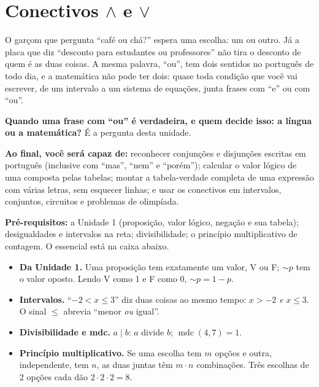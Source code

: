 \providecommand{\nao}{{\sim}}
\clearpage
\section{Conectivos \texorpdfstring{$\wedge$}{∧} e \texorpdfstring{$\vee$}{∨}}

\Prefacio
\begin{prefacio}

O garçom que pergunta \enquote{café ou chá?} espera uma escolha: um ou outro. Já a placa que diz \enquote{desconto para estudantes ou professores} não tira o desconto de quem é as duas coisas. A mesma palavra, \enquote{ou}, tem dois sentidos no português de todo dia, e a matemática não pode ter dois: quase toda condição que você vai escrever, de um intervalo a um sistema de equações, junta frases com \enquote{e} ou com \enquote{ou}.

\textbf{Quando uma frase com \enquote{ou} é verdadeira, e quem decide isso: a língua ou a matemática?} É a pergunta desta unidade.

\textbf{Ao final, você será capaz de:} reconhecer conjunções e disjunções escritas em português (inclusive com \enquote{mas}, \enquote{nem} e \enquote{porém}); calcular o valor lógico de uma composta pelas tabelas; montar a tabela-verdade completa de uma expressão com várias letras, sem esquecer linhas; e usar os conectivos em intervalos, conjuntos, circuitos e problemas de olimpíada.

\textbf{Pré-requisitos:} a Unidade 1 (proposição, valor lógico, negação e sua tabela); desigualdades e intervalos na reta; divisibilidade; o princípio multiplicativo de contagem. O essencial está na caixa abaixo.
\end{prefacio}

\begin{minimo}
\begin{itemize}[leftmargin=1.2em]
  \item \textbf{Da Unidade 1.} Uma proposição tem exatamente um valor, V ou F; ${\nao}p$ tem o valor oposto. Lendo V como 1 e F como 0, ${\nao}p = 1-p$.
  \item \textbf{Intervalos.} \enquote{$-2<x\le 3$} diz duas coisas ao mesmo tempo: $x>-2$ \emph{e} $x\le 3$. O sinal $\le$ abrevia \enquote{menor \emph{ou} igual}.
  \item \textbf{Divisibilidade e mdc.} $a\mid b$: $a$ divide $b$; $\operatorname{mdc}(4,7)=1$.
  \item \textbf{Princípio multiplicativo.} Se uma escolha tem $m$ opções e outra, independente, tem $n$, as duas juntas têm $m\cdot n$ combinações. Três escolhas de 2 opções cada dão $2\cdot2\cdot2=8$.
\end{itemize}
\end{minimo}

